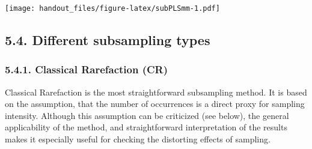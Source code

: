 \documentclass[]{article}
\newenvironment{Shaded}{\begin{snugshade}}{\end{snugshade}}
\newcommand{\DataTypeTok}[1]{\textcolor[rgb]{0.13,0.29,0.53}{#1}}
\newcommand{\DecValTok}[1]{\textcolor[rgb]{0.00,0.00,0.81}{#1}}
\newcommand{\KeywordTok}[1]{\textcolor[rgb]{0.13,0.29,0.53}{\textbf{#1}}}
\newcommand{\NormalTok}[1]{#1}
\newcommand{\OperatorTok}[1]{\textcolor[rgb]{0.81,0.36,0.00}{\textbf{#1}}}
\newcommand{\StringTok}[1]{\textcolor[rgb]{0.31,0.60,0.02}{#1}}
\begin{document}
\begin{Shaded}
\end{Shaded}

\texttt{[image: handout\_files/figure-latex/subPLSmm-1.pdf]}

\begin{Shaded}
\end{Shaded}

\hypertarget{different-subsampling-types}{%
\subsection{5.4. Different subsampling
types}\label{different-subsampling-types}}

\hypertarget{classical-rarefaction-cr}{%
\subsubsection{5.4.1. Classical Rarefaction
(CR)}\label{classical-rarefaction-cr}}

Classical Rarefaction is the most straightforward subsampling method. It
is based on the assumption, that the number of occurrences is a direct
proxy for sampling intensity. Although this assumption can be criticized
(see below), the general applicability of the method, and
straightforward interpretation of the results makes it especially useful
for checking the distorting effects of sampling.
\end{document}
